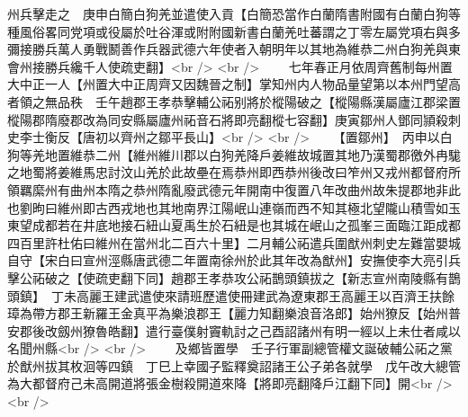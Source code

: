 州兵擊走之　庚申白簡白狗羌並遣使入貢【白簡恐當作白蘭隋書附國有白蘭白狗等種風俗畧同党項或役屬於吐谷渾或附附國新書白蘭羌吐蕃謂之丁零左屬党項右與多彌接勝兵萬人勇戰鬭善作兵器武德六年使者入朝明年以其地為維恭二州白狗羌與東會州接勝兵纔千人使疏吏翻】<br />
<br />
　　七年春正月依周齊舊制每州置大中正一人【州置大中正周齊又因魏晉之制】掌知州内人物品量望第以本州門望高者領之無品秩　壬午趙郡王孝恭擊輔公祏别將於樅陽破之【樅陽縣漢屬廬江郡梁置樅陽郡隋廢郡改為同安縣屬廬州祏音石將即亮翻樅七容翻】庚寅鄒州人鄧同頴殺刺史李士衡反【唐初以齊州之鄒平長山】<br />
<br />
　　【置鄒州】　丙申以白狗等羌地置維恭二州【維州維川郡以白狗羌降戶姜維故城置其地乃漢蜀郡徼外冉駹之地蜀將姜維馬忠討汶山羌於此故壘在焉恭州即西恭州後改曰笮州又戎州都督府所領羈縻州有曲州本隋之恭州隋亂廢武德元年開南中復置八年改曲州故朱提郡地非此也劉昫曰維州即古西戎地也其地南界江陽岷山連嶺而西不知其極北望隴山積雪如玉東望成都若在井底地接石紐山夏禹生於石紐是也其城在岷山之孤峯三面臨江距成都四百里許杜佑曰維州在當州北二百六十里】二月輔公祏遣兵圍猷州刺史左難當嬰城自守【宋白曰宣州涇縣唐武德二年置南徐州於此其年改為猷州】安撫使李大亮引兵擊公祏破之【使疏吏翻下同】趙郡王孝恭攻公祏鵲頭鎮拔之【新志宣州南陵縣有鵲頭鎮】　丁未高麗王建武遣使來請班歷遣使冊建武為遼東郡王高麗王以百濟王扶餘璋為帶方郡王新羅王金真平為樂浪郡王【麗力知翻樂浪音洛郎】始州獠反【始州普安郡後改劔州獠魯皓翻】遣行臺僕射竇軌討之己酉詔諸州有明一經以上未仕者咸以名聞州縣<br />
<br />
　　及鄉皆置學　壬子行軍副總管權文誕破輔公祏之黨於猷州拔其枚洄等四鎮　丁巳上幸國子監釋奠詔諸王公子弟各就學　戊午改大總管為大都督府己未高開道將張金樹殺開道來降【將即亮翻降戶江翻下同】開<br />
<br />
